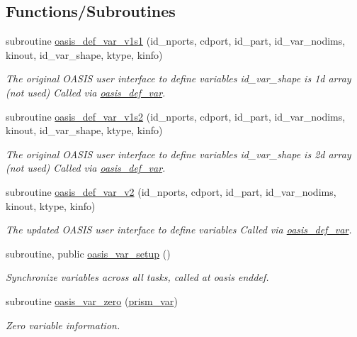 \subsection*{Functions/\+Subroutines}
\begin{DoxyCompactItemize}
\item 
subroutine \hyperlink{namespacemod__oasis__var_ab28530889758da2183e09f345c0993f1}{oasis\+\_\+def\+\_\+var\+\_\+v1s1} (id\+\_\+nports, cdport, id\+\_\+part, id\+\_\+var\+\_\+nodims, kinout, id\+\_\+var\+\_\+shape, ktype, kinfo)
\begin{DoxyCompactList}\small\item\em The original O\+A\+S\+IS user interface to define variables id\+\_\+var\+\_\+shape is 1d array (not used) Called via \hyperlink{interfacemod__oasis__var_1_1oasis__def__var}{oasis\+\_\+def\+\_\+var}. \end{DoxyCompactList}\item 
subroutine \hyperlink{namespacemod__oasis__var_a63fa94287280b746e4fc7b811f377ceb}{oasis\+\_\+def\+\_\+var\+\_\+v1s2} (id\+\_\+nports, cdport, id\+\_\+part, id\+\_\+var\+\_\+nodims, kinout, id\+\_\+var\+\_\+shape, ktype, kinfo)
\begin{DoxyCompactList}\small\item\em The original O\+A\+S\+IS user interface to define variables id\+\_\+var\+\_\+shape is 2d array (not used) Called via \hyperlink{interfacemod__oasis__var_1_1oasis__def__var}{oasis\+\_\+def\+\_\+var}. \end{DoxyCompactList}\item 
subroutine \hyperlink{namespacemod__oasis__var_a1d95fff92118dedf036d117a8b8e856f}{oasis\+\_\+def\+\_\+var\+\_\+v2} (id\+\_\+nports, cdport, id\+\_\+part, id\+\_\+var\+\_\+nodims, kinout, ktype, kinfo)
\begin{DoxyCompactList}\small\item\em The updated O\+A\+S\+IS user interface to define variables Called via \hyperlink{interfacemod__oasis__var_1_1oasis__def__var}{oasis\+\_\+def\+\_\+var}. \end{DoxyCompactList}\item 
subroutine, public \hyperlink{namespacemod__oasis__var_ab33b7fbec62bcfd15e9cd7f912f71035}{oasis\+\_\+var\+\_\+setup} ()
\begin{DoxyCompactList}\small\item\em Synchronize variables across all tasks, called at oasis enddef. \end{DoxyCompactList}\item 
subroutine \hyperlink{namespacemod__oasis__var_aa780f62e9eded0a55d0077a990bf2443}{oasis\+\_\+var\+\_\+zero} (\hyperlink{namespacemod__oasis__var_ae66c490437c2960d795fbd3d2c773a0a}{prism\+\_\+var})
\begin{DoxyCompactList}\small\item\em Zero variable information. \end{DoxyCompactList}\end{DoxyCompactItemize}

